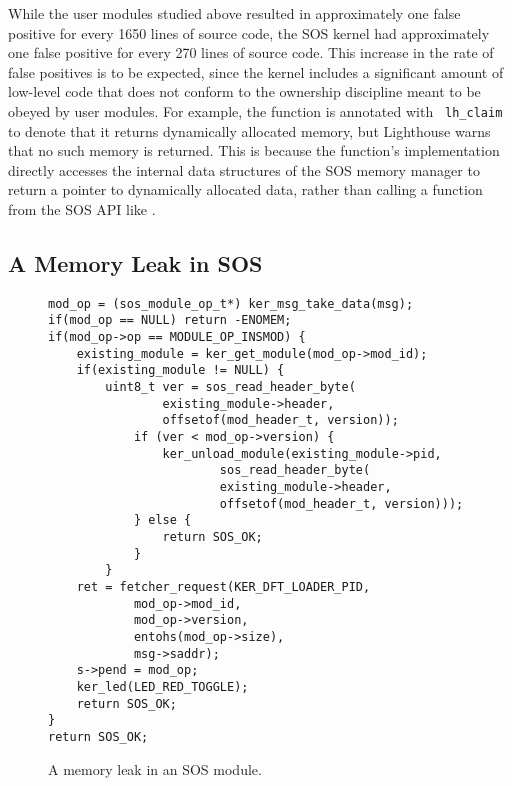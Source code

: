 While the user modules studied above resulted 
in approximately one false positive for every 1650 lines of source
code, the SOS kernel had approximately one
false positive for every 270 lines of source code.  
This increase in the rate of false positives is to be expected, since
the kernel includes a significant amount of low-level code that does
not conform to the ownership discipline meant to be obeyed by user
modules.
For example,
the function  is annotated with {\tt
  lh\_claim} to denote that
it returns dynamically allocated memory, but Lighthouse warns that
no such memory is returned.  This is because the function's
implementation directly
accesses the internal data structures of the SOS memory manager to
return a pointer to dynamically allocated data, rather than calling a
function from the SOS API like 
.


%
% 

\subsection{A Memory Leak in SOS}
\label{ss:tale}

\begin{figure}[tp]
\begin{scriptsize}
\begin{verbatim}
mod_op = (sos_module_op_t*) ker_msg_take_data(msg);
if(mod_op == NULL) return -ENOMEM;
if(mod_op->op == MODULE_OP_INSMOD) {
    existing_module = ker_get_module(mod_op->mod_id);
    if(existing_module != NULL) {
        uint8_t ver = sos_read_header_byte(
                existing_module->header,
                offsetof(mod_header_t, version));
            if (ver < mod_op->version) {
                ker_unload_module(existing_module->pid, 
                        sos_read_header_byte(
                        existing_module->header,
                        offsetof(mod_header_t, version)));
            } else {
                return SOS_OK;
            }
        }
    ret = fetcher_request(KER_DFT_LOADER_PID,
            mod_op->mod_id,
            mod_op->version,
            entohs(mod_op->size),
            msg->saddr);
    s->pend = mod_op;
    ker_led(LED_RED_TOGGLE);
    return SOS_OK;
}
return SOS_OK;
\end{verbatim}
\end{scriptsize}
\caption{\label{fig:leak}A memory leak in an SOS module.}
\end{figure}

